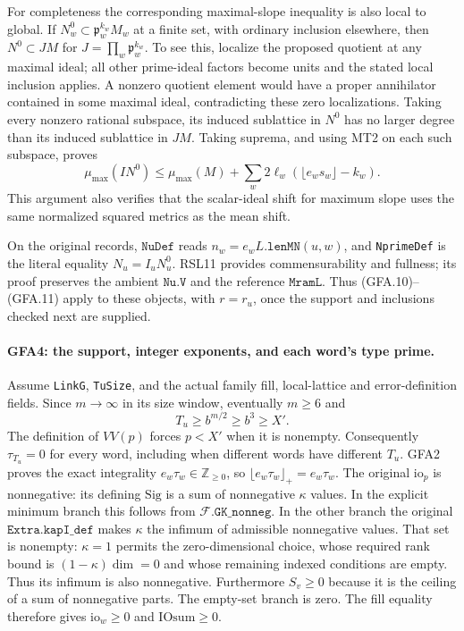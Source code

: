 For completeness the corresponding maximal-slope inequality is
also local to global.  If $N_w^0\subset\mathfrak p_w^{k_w}M_w$
at a finite set, with ordinary inclusion elsewhere, then
$N^0\subset JM$ for $J=\prod_w\mathfrak p_w^{k_w}$.
To see this, localize the proposed quotient at any maximal ideal;
all other prime-ideal factors become units and the stated local
inclusion applies.  A nonzero quotient element would have a proper
annihilator contained in some maximal ideal, contradicting these
zero localizations.  Taking every nonzero rational subspace, its
induced sublattice in $N^0$ has no larger degree than its induced
sublattice in $JM$.  Taking suprema, and using MT2 on each such
subspace, proves
\[
 \mu_{\max}(IN^0)\le\mu_{\max}(M)
       +\sum_w2\ell_w(\lfloor e_ws_w\rfloor-k_w).             \tag{GFA.11}
\]
This argument also verifies that the scalar-ideal shift for maximum
slope uses the same normalized squared metrics as the mean shift.

On the original records, $\texttt{NuDef}$ reads
$n_w=e_wL.\texttt{lenMN}(u,w)$, and \texttt{NprimeDef} is the
literal equality $N_u=I_uN_u^0$.  RSL11 provides commensurability
and fullness; its proof preserves the ambient $\texttt{Nu.V}$ and
the reference $\texttt{MramL}$.  Thus (GFA.10)--(GFA.11) apply
to these objects, with $r=r_u$, once the support and inclusions
checked next are supplied.

\paragraph{GFA4: the support, integer exponents, and each word's type prime.}
\label{claim:GFA4}
Assume \texttt{LinkG}, \texttt{TuSize}, and the actual family fill,
local-lattice and error-definition fields.  Since $m\to\infty$
in its size window, eventually $m\ge6$ and
\[
 T_u\ge b^{m/2}\ge b^3\ge X'.                              \tag{GFA.12}
\]
The definition of $VV(p)$ forces $p<X'$ when it is nonempty.
Consequently $\tau_{T_u}=0$ for every word, including when
different words have different $T_u$.
GFA2 proves the exact integrality $e_w\tau_w\in\mathbb Z_{\ge0}$,
so $\lfloor e_w\tau_w\rfloor_+=e_w\tau_w$.
The original $\mathrm{io}_p$ is nonnegative: its defining
$\mathrm{Sig}$ is a sum of nonnegative $\kappa$ values.
In the explicit minimum branch this follows from
$\mathcal F.\texttt{GK\_nonneg}$.  In the other branch the
original $\texttt{Extra.kapI\_def}$ makes $\kappa$ the infimum
of admissible nonnegative values.  That set is nonempty:
$\kappa=1$ permits the zero-dimensional choice, whose required
rank bound is $(1-\kappa)\dim=0$ and whose remaining indexed
conditions are empty.  Thus its infimum is also nonnegative.
Furthermore
$S_v\ge0$ because it is the ceiling of a sum of nonnegative
parts.  The empty-set branch is zero.  The fill equality therefore
gives $\mathrm{io}_w\ge0$ and $\mathrm{IOsum}\ge0$.

